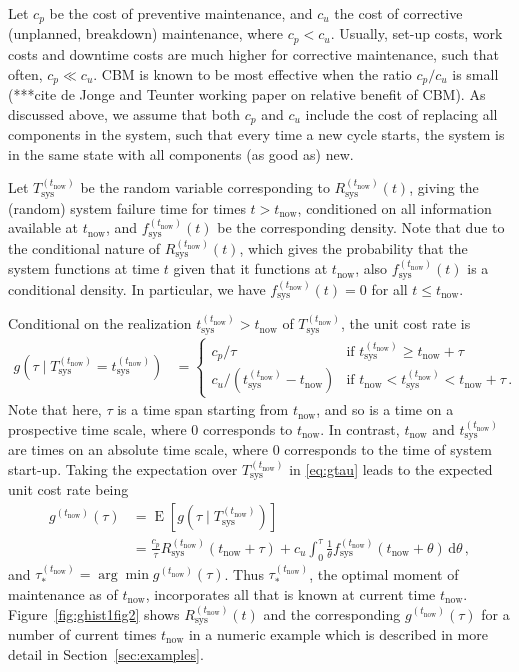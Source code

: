 \documentclass[authoryear]{elsarticle}
\newcommand{\dd}{\,\mathrm{d}}
\newcommand{\E}{\operatorname{E}}
\def\tnow{t_\text{now}}
\newcommand{\Rsysnow}{R^{(t_\text{now})}_\text{sys}}
\newcommand{\Tsysnow}{T^{(t_\text{now})}_\text{sys}}
\newcommand{\tsysnow}{t^{(t_\text{now})}_\text{sys}}
\newcommand{\fsysnow}{f^{(t_\text{now})}_\text{sys}}
\newcommand{\gnow}{g^{(\tnow)}}
\newcommand{\tausnow}{\tau_*^{(\tnow)}}
\begin{document}
Let $c_p$ be the cost of preventive maintenance, and $c_u$ the cost of corrective (unplanned, breakdown) maintenance, where $c_p < c_u$.
Usually, set-up costs, work costs and downtime costs are much higher for corrective maintenance,
such that often, $c_p \ll c_u$.
CBM is known to be most effective when the ratio $c_p / c_u$ is small
(***cite de Jonge and Teunter working paper on relative benefit of CBM).
%
As discussed above,
we assume that both $c_p$ and $c_u$ include the cost of replacing all components in the system,
such that every time a new cycle starts, the system is in the same state with all components (as good as) new.

Let $\Tsysnow$ be the random variable corresponding to $\Rsysnow(t)$,
giving the (random) system failure time for times $t > \tnow$,
conditioned on all information available at $\tnow$,
and $\fsysnow(t)$ be the corresponding density.
Note that due to the conditional nature of $\Rsysnow(t)$,
which gives the probability that the system functions at time $t$ given that it functions at $\tnow$,
also $\fsysnow(t)$ is a conditional density.
In particular, we have $\fsysnow(t) = 0$ for all $t \le \tnow$.

Conditional on the realization $\tsysnow > \tnow$ of $\Tsysnow$, the unit cost rate is 
\begin{align}
g(\tau \mid \Tsysnow = \tsysnow) &=
\begin{cases}
c_p / \tau               & \text{if } \tsysnow \ge \tnow + \tau \\
c_u / (\tsysnow - \tnow) & \text{if } \tnow < \tsysnow  <  \tnow + \tau \,.
\end{cases}
\label{eq:gtau}
\end{align}
Note that here, $\tau$ is a time span starting from $\tnow$,
and so is a time on a prospective time scale, where $0$ corresponds to $\tnow$.
In contrast, $\tnow$ and $\tsysnow$ are times on an absolute time scale,
where $0$ corresponds to the time of system start-up.
Taking the expectation over $\Tsysnow$ in \eqref{eq:gtau} leads to the expected unit cost rate being
\begin{align}
\gnow(\tau) &= \E[g(\tau \mid \Tsysnow)] \nonumber\\ 
            &= \frac{c_p}{\tau} \Rsysnow(\tnow + \tau) + c_u \int_0^\tau \frac{1}{\theta} \fsysnow(\tnow + \theta) \dd \theta\,,
\label{eq:gtnowtau}
\end{align}
and $\tausnow = \arg\min \gnow(\tau)$.
Thus $\tausnow$, the optimal moment of maintenance as of $\tnow$,
incorporates all that is known at current time $\tnow$.
Figure~\ref{fig:ghist1fig2} shows $\Rsysnow(t)$ and the corresponding $\gnow(\tau)$ for a number of current times $\tnow$
in a numeric example which is described in more detail in Section~\ref{sec:examples}.
\end{document}

